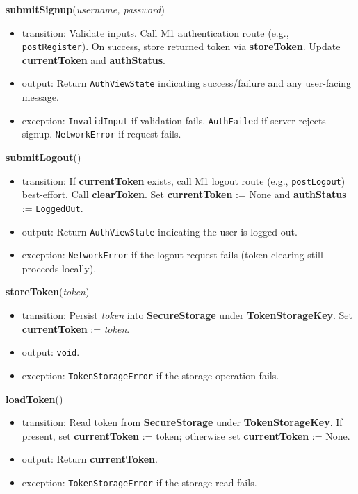 \documentclass[12pt, titlepage]{article}
\begin{document}
\noindent\textbf{submitSignup}(\textit{username, password})
\begin{itemize}
    \item transition: Validate inputs. Call M1 authentication route (e.g., \texttt{postRegister}). On success, store returned token via \textbf{storeToken}. Update \textbf{currentToken} and \textbf{authStatus}.
    \item output: Return \texttt{AuthViewState} indicating success/failure and any user-facing message.
    \item exception: \texttt{InvalidInput} if validation fails. \texttt{AuthFailed} if server rejects signup. \texttt{NetworkError} if request fails.
\end{itemize}

\noindent\textbf{submitLogout}()
\begin{itemize}
    \item transition: If \textbf{currentToken} exists, call M1 logout route (e.g., \texttt{postLogout}) best-effort. Call \textbf{clearToken}. Set \textbf{currentToken} := None and \textbf{authStatus} := \texttt{LoggedOut}.
    \item output: Return \texttt{AuthViewState} indicating the user is logged out.
    \item exception: \texttt{NetworkError} if the logout request fails (token clearing still proceeds locally).
\end{itemize}

\noindent\textbf{storeToken}(\textit{token})
\begin{itemize}
    \item transition: Persist \textit{token} into \textbf{SecureStorage} under \textbf{TokenStorageKey}. Set \textbf{currentToken} := \textit{token}.
    \item output: \texttt{void}.
    \item exception: \texttt{TokenStorageError} if the storage operation fails.
\end{itemize}

\noindent\textbf{loadToken}()
\begin{itemize}
    \item transition: Read token from \textbf{SecureStorage} under \textbf{TokenStorageKey}. If present, set \textbf{currentToken} := token; otherwise set \textbf{currentToken} := None.
    \item output: Return \textbf{currentToken}.
    \item exception: \texttt{TokenStorageError} if the storage read fails.
\end{itemize}
\end{document}
